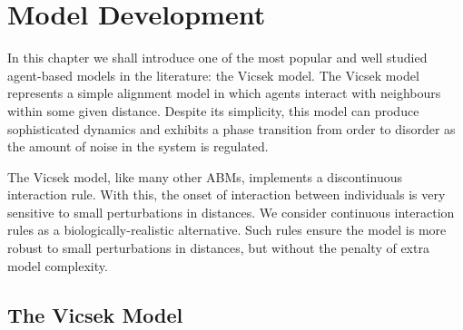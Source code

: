 \graphicspath{{fig/model_development/}}

\chapter{Model Development}
\label{cha:model_dev}

In this chapter we shall introduce one of the most popular and well studied agent-based
models in the literature: the Vicsek model. The Vicsek model represents a simple alignment
model in which agents interact with neighbours within some given distance. Despite its
simplicity, this model can produce sophisticated dynamics and exhibits a phase
transition from order to disorder as the amount of noise in the system is regulated.

The Vicsek model, like many other ABMs, implements a discontinuous interaction rule. With
this, the onset of interaction between individuals is very sensitive to small
perturbations in distances. We consider continuous interaction rules as a
biologically-realistic alternative. Such rules ensure the model is more robust to small
perturbations in distances, but without the penalty of extra model complexity.

\section{The Vicsek Model}

